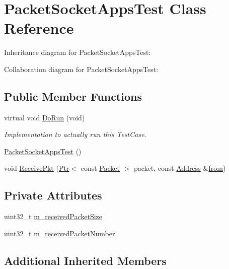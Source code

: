 \hypertarget{classPacketSocketAppsTest}{}\section{Packet\+Socket\+Apps\+Test Class Reference}
\label{classPacketSocketAppsTest}


Inheritance diagram for Packet\+Socket\+Apps\+Test\+:


Collaboration diagram for Packet\+Socket\+Apps\+Test\+:
\subsection*{Public Member Functions}
\begin{DoxyCompactItemize}
\item 
virtual void \hyperlink{classPacketSocketAppsTest_ab2f827993135c4bf011cb6247aed5d43}{Do\+Run} (void)
\begin{DoxyCompactList}\small\item\em Implementation to actually run this Test\+Case. \end{DoxyCompactList}\item 
\hyperlink{classPacketSocketAppsTest_ad9dfcd23a9958967fc0edf0a61a7b57e}{Packet\+Socket\+Apps\+Test} ()
\item 
void \hyperlink{classPacketSocketAppsTest_a98d4457730e534b516b66db2b1181226}{Receive\+Pkt} (\hyperlink{classns3_1_1Ptr}{Ptr}$<$ const \hyperlink{classns3_1_1Packet}{Packet} $>$ packet, const \hyperlink{classns3_1_1Address}{Address} \&\hyperlink{lte__amc_8m_a1b4c81ff74eb1a626b5ade44c81004b3}{from})
\end{DoxyCompactItemize}
\subsection*{Private Attributes}
\begin{DoxyCompactItemize}
\item 
uint32\+\_\+t \hyperlink{classPacketSocketAppsTest_a0738bf3e280b06db8467f6b5bf14a6b0}{m\+\_\+received\+Packet\+Size}
\item 
uint32\+\_\+t \hyperlink{classPacketSocketAppsTest_a9683f11fc55d39e7e0938d82a11de79c}{m\+\_\+received\+Packet\+Number}
\end{DoxyCompactItemize}
\subsection*{Additional Inherited Members}


